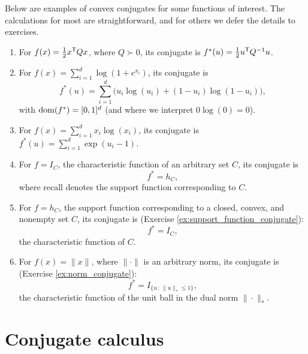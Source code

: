 \begin{Example}
Below are examples of convex conjugates for some functions of interest. The
calculations for most are straightforward, and for others we defer the details
to exercises.  

\begin{enumerate}[label=\alph*., ref=\alph*]
\item {}
  For $f(x) = \frac{1}{2} x^{\mathsf{T}} Q x$, where $Q \succ 0$, its conjugate is $f^*(u)
  = \frac{1}{2} u^{\mathsf{T}} Q^{-1} u$.  

\item For $f(x) = \sum_{i=1}^d \log(1+e^{x_i})$, its conjugate is 
  \[
  f^*(u) = \sum_{i=1}^d \big( u_i \log(u_i) + (1-u_i) \log(1-u_i) \big), 
  \] 
  with $\operatorname{dom}(f^*) = [0,1]^d$ (and where we interpret $0 \log(0) = 0$). 

\item For $f(x) = \sum_{i=1}^d x_i \log(x_i)$, its conjugate is $f^*(u) =
  \sum_{i=1}^d \exp(u_i - 1)$. 

\item {}   
  For $f = I_C$, the characteristic function of an arbitrary set $C$, its
  conjugate is  
  \[
  f^* = h_C,
  \]
  where recall  denotes the support
  function corresponding to $C$.  

\item {} 
  For $f = h_C$, the support function corresponding to a closed, convex, and
  nonempty set $C$, its conjugate is (Exercise
  \ref{ex:support_function_conjugate}):    
  \[
  f^* = I_C,
  \]
  the characteristic function of $C$. 

\item {}  
  For $f(x) = \|x\|$, where $\|\cdot\|$ is an arbitrary norm, its conjugate is
  (Exercise \ref{ex:norm_conjugate}):  
  \[
  f^* = I_{\{u \,:\, \|u\|_* \leq 1\}},
  \]
  the characteristic function of the unit ball in the dual norm
  $\|\cdot\|_*$.
\end{enumerate}
\end{Example}

\section{Conjugate calculus}

